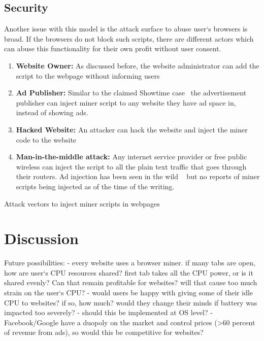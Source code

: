 \subsection{Security}
Another issue with this model is the attack surface to abuse user`s browsers is broad. If the browsers do not block such scripts, there are different actors which can abuse this functionality for their own profit without user consent.
\begin{enumerate}
\item \textbf{Website Owner:} As discussed before, the website administrator can add the script to the webpage without informing users
\item \textbf{Ad Publisher:} Similar to the claimed Showtime case~\cite{showtimehive} the advertisement publisher can inject miner script to any website they have ad space in, instead of showing ads.
\item \textbf{Hacked Website:} An attacker can hack the website and inject the miner code to the website
\item \textbf{Man-in-the-middle attack:} Any internet service provider or free public wireless can inject the script to all the plain text traffic that goes through their routers. Ad injection has been seen in the wild ~\cite{vergeadinjection} but no reports of miner scripts being injected as of the time of the writing.
\end{enumerate}

\begin{center}
	\caption{Attack vectors to inject miner scripts in webpages}
\end{center}

\section{Discussion}
Future possibilities:
	- every website uses a browser miner. if many tabs are open, how are user`s CPU resources shared? first tab takes all the CPU 		power, or is it shared evenly? Can that remain profitable for websites? will that cause too much strain on the user`s CPU?
	- would users be happy with giving some of their idle CPU to websites? if so, how much? would they change their minds if battery 	was impacted too severely?
	- should this be implemented at OS level?
	- Facebook/Google have a duopoly on the market and control prices (>60 percent of revenue from ads), so would this be 			competitive for websites?

